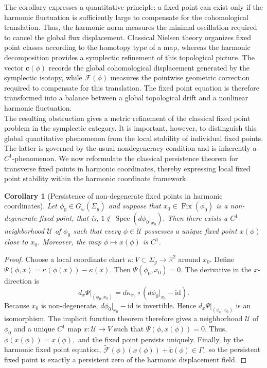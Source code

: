 \documentclass[11pt]{article}
\newtheorem{corollary}[theorem]{Corollary}
\theoremstyle{definition}
\begin{document}
	The corollary expresses a quantitative principle: a fixed point can exist only
	if the harmonic fluctuation is sufficiently large to compensate for the
	cohomological translation.	Thus, the harmonic norm measures the minimal oscillation required to cancel the
	global flux displacement. Classical Nielsen theory organizes fixed point classes
	according to the homotopy type of a map, whereas the harmonic decomposition
	provides a symplectic refinement of this topological picture. The vector $\mathbf
	c(\phi)$ records the global cohomological displacement generated by the
	symplectic isotopy, while $\mathcal F(\phi)$ measures the pointwise geometric
	correction required to compensate for this translation. The fixed point equation
	is therefore transformed into a balance between a global topological drift and a
	nonlinear harmonic fluctuation.\\
	
	The resulting obstruction gives a metric refinement of the classical fixed point
	problem in the symplectic category. It is important, however, to distinguish
	this global quantitative phenomenon from the local stability of individual fixed
	points. The latter is governed by the usual nondegeneracy condition and is
	inherently a $C^1$-phenomenon. We now reformulate the classical persistence
	theorem for transverse fixed points in harmonic coordinates, thereby expressing
	local fixed point stability within the harmonic coordinate framework.
	
	\begin{corollary}[Persistence of non-degenerate fixed points in harmonic coordinates]
		\label{cor:transverse_stability}
		Let $\phi_0\in G_\omega(\Sigma_g)$ and suppose that $x_0\in\operatorname{Fix}(\phi_0)$
		is a non-degenerate fixed point, that is, $1\notin \operatorname{Spec}(d\phi_0|_{x_0}).$
		Then there exists a $C^1$-neighborhood $\mathcal U$ of $\phi_0$ such that every
		$\phi\in\mathcal U$ possesses a unique fixed point $x(\phi)$ close to $x_0$.
		Moreover, the map $\phi\mapsto x(\phi)$ is $C^1$.
	\end{corollary}
	
	\begin{proof}
		Choose a local coordinate chart $\kappa:V\subset\Sigma_g\longrightarrow\mathbb
		R^2$ around $x_0$. Define $\Psi(\phi,x) = \kappa(\phi(x))-\kappa(x).$ Then
		$\Psi(\phi_0,x_0)=0.$ The derivative in the $x$-direction is
		\[
		d_x\Psi|_{(\phi_0,x_0)} = d\kappa_{x_0} \circ (d\phi_0|_{x_0}-\mathrm{id}).
		\]
		Because $x_0$ is non-degenerate, $d\phi_0|_{x_0}-\mathrm{id}$ is invertible.
		Hence $d_x\Psi|_{(\phi_0,x_0)}$ is an isomorphism. The implicit function
		theorem therefore gives a neighborhood $\mathcal U$ of $\phi_0$ and a unique
		$C^1$ map $x:\mathcal U\rightarrow V$ such that $\Psi(\phi,x(\phi))=0.$ Thus,
		$\phi(x(\phi))=x(\phi),$ and the fixed point persists uniquely.	Finally, by the harmonic fixed point equation, $\widetilde{\mathcal
			F}(\phi)(x(\phi)) +\widetilde{\mathbf c}(\phi) \in\Gamma,$ so the persistent
		fixed point is exactly a persistent zero of the harmonic displacement field.
	\end{proof}
	
\end{document}
